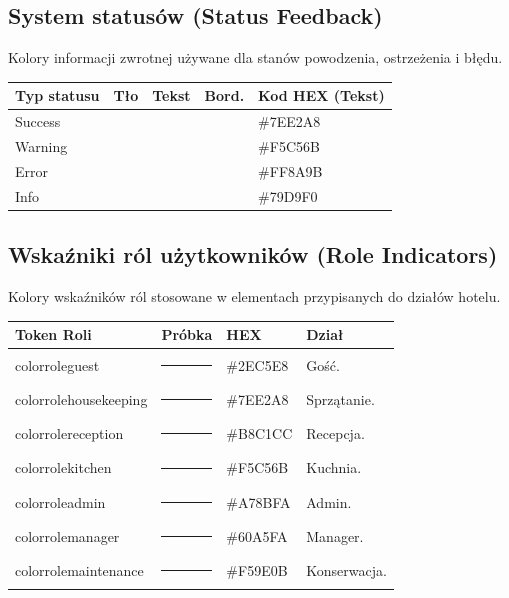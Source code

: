 \subsection{System statusów (Status Feedback)}
Kolory informacji zwrotnej używane dla stanów powodzenia, ostrzeżenia i błędu.

\begin{table}[H]
\centering
\small
\begin{tabular}{|l|c|c|c|l|}
\hline
\textbf{Typ statusu} & \textbf{Tło} & \textbf{Tekst} & \textbf{Bord.} & \textbf{Kod HEX (Tekst)} \\ \hline
Success & \colorbox{statusSuccessBg}{\phantom{XX}} & \colorbox{statusSuccessText}{\phantom{XX}} & \colorbox{statusSuccessBorder}{\phantom{XX}} & \#7EE2A8 \\ \hline
Warning & \colorbox{statusWarningBg}{\phantom{XX}} & \colorbox{statusWarningText}{\phantom{XX}} & \colorbox{statusWarningBorder}{\phantom{XX}} & \#F5C56B \\ \hline
Error & \colorbox{statusErrorBg}{\phantom{XX}} & \colorbox{statusErrorText}{\phantom{XX}} & \colorbox{statusErrorBorder}{\phantom{XX}} & \#FF8A9B \\ \hline
Info & \colorbox{statusInfoBg}{\phantom{XX}} & \colorbox{statusInfoText}{\phantom{XX}} & \colorbox{statusInfoBorder}{\phantom{XX}} & \#79D9F0 \\ \hline
\end{tabular}
\end{table}

\subsection{Wskaźniki ról użytkowników (Role Indicators)}
Kolory wskaźników ról stosowane w elementach przypisanych do działów hotelu.

\begin{table}[H]
\centering
\small
\begin{tabular}{|l|c|l|l|}
\hline
\textbf{Token Roli} & \textbf{Próbka} & \textbf{HEX} & \textbf{Dział} \\ \hline
\/color\/role\/guest & {\color{roleGuest}\rule{0.8cm}{0.4cm}} & \#2EC5E8 & Gość. \\ \hline
\/color\/role\/housekeeping & {\color{roleHouse}\rule{0.8cm}{0.3cm}} & \#7EE2A8 & Sprzątanie. \\ \hline
\/color\/role\/reception & {\color{roleRecep}\rule{0.8cm}{0.4cm}} & \#B8C1CC & Recepcja. \\ \hline
\/color\/role\/kitchen & {\color{roleKitchen}\rule{0.8cm}{0.4cm}} & \#F5C56B & Kuchnia. \\ \hline
\/color\/role\/admin & {\color{roleAdmin}\rule{0.8cm}{0.4cm}} & \#A78BFA & Admin. \\ \hline
\/color\/role\/manager & {\color{roleManager}\rule{0.8cm}{0.4cm}} & \#60A5FA & Manager. \\ \hline
\/color\/role\/maintenance & {\color{roleMaint}\rule{0.8cm}{0.4cm}} & \#F59E0B & Konserwacja. \\ \hline
\end{tabular}
\end{table}